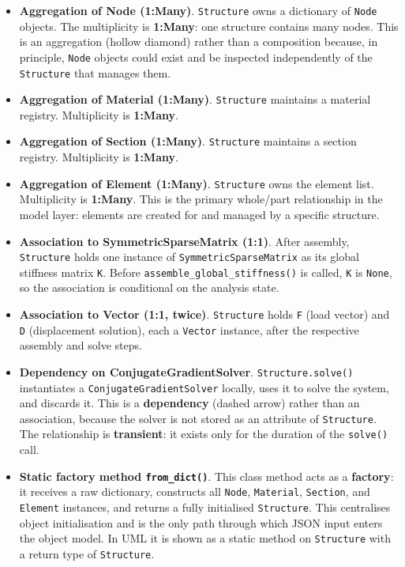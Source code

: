 \begin{itemize}
  \item \textbf{Aggregation of Node (1:Many)}.
  \texttt{Structure} owns a dictionary of \texttt{Node} objects.
  The multiplicity is \textbf{1:Many}: one structure contains many
  nodes.
  This is an aggregation (hollow diamond) rather than a composition
  because, in principle, \texttt{Node} objects could exist and be
  inspected independently of the \texttt{Structure} that manages them.

  \item \textbf{Aggregation of Material (1:Many)}.
  \texttt{Structure} maintains a material registry.
  Multiplicity is \textbf{1:Many}.

  \item \textbf{Aggregation of Section (1:Many)}.
  \texttt{Structure} maintains a section registry.
  Multiplicity is \textbf{1:Many}.

  \item \textbf{Aggregation of Element (1:Many)}.
  \texttt{Structure} owns the element list.
  Multiplicity is \textbf{1:Many}.
  This is the primary whole/part relationship in the model layer:
  elements are created for and managed by a specific structure.

  \item \textbf{Association to SymmetricSparseMatrix (1:1)}.
  After assembly, \texttt{Structure} holds one instance of
  \texttt{SymmetricSparseMatrix} as its global stiffness matrix
  \texttt{K}.
  Before \texttt{assemble\_global\_stiffness()} is called, \texttt{K}
  is \texttt{None}, so the association is conditional on the analysis
  state.

  \item \textbf{Association to Vector (1:1, twice)}.
  \texttt{Structure} holds \texttt{F} (load vector) and \texttt{D}
  (displacement solution), each a \texttt{Vector} instance, after the
  respective assembly and solve steps.

  \item \textbf{Dependency on ConjugateGradientSolver}.
  \texttt{Structure.solve()} instantiates a
  \texttt{ConjugateGradientSolver} locally, uses it to solve the
  system, and discards it.
  This is a \textbf{dependency} (dashed arrow) rather than an
  association, because the solver is not stored as an attribute of
  \texttt{Structure}.
  The relationship is \textbf{transient}: it exists only for the
  duration of the \texttt{solve()} call.

  \item \textbf{Static factory method \texttt{from\_dict()}}.
  This class method acts as a \textbf{factory}: it receives a raw
  dictionary, constructs all \texttt{Node}, \texttt{Material},
  \texttt{Section}, and \texttt{Element} instances, and returns a fully
  initialised \texttt{Structure}.
  This centralises object initialisation and is the only path through
  which JSON input enters the object model.
  In UML it is shown as a static method on \texttt{Structure} with a
  return type of \texttt{Structure}.
\end{itemize}

